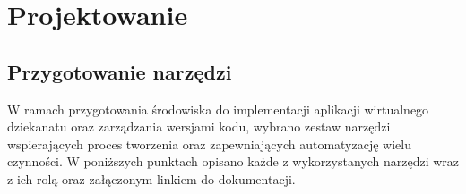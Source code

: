 \newpage
\section{Projektowanie}
\subsection{Przygotowanie narzędzi}

W ramach przygotowania środowiska do implementacji aplikacji wirtualnego dziekanatu oraz zarządzania wersjami kodu, wybrano zestaw narzędzi wspierających proces tworzenia oraz zapewniających automatyzację wielu czynności. W poniższych punktach opisano każde z wykorzystanych narzędzi wraz z ich rolą oraz załączonym linkiem do dokumentacji.

